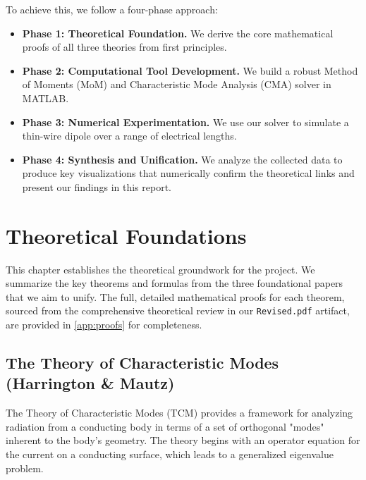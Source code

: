 \documentclass[11pt, a4paper]{report}
\begin{document}
To achieve this, we follow a four-phase approach:
\begin{itemize}
    \item \textbf{Phase 1: Theoretical Foundation.} We derive the core mathematical proofs of all three theories from first principles.
    \item \textbf{Phase 2: Computational Tool Development.} We build a robust Method of Moments (MoM) and Characteristic Mode Analysis (CMA) solver in MATLAB.
    \item \textbf{Phase 3: Numerical Experimentation.} We use our solver to simulate a thin-wire dipole over a range of electrical lengths.
    \item \textbf{Phase 4: Synthesis and Unification.} We analyze the collected data to produce key visualizations that numerically confirm the theoretical links and present our findings in this report.
\end{itemize}

\newpage

\chapter{Theoretical Foundations} \label{ch:theory}

This chapter establishes the theoretical groundwork for the project. We summarize the key theorems and formulas from the three foundational papers that we aim to unify. The full, detailed mathematical proofs for each theorem, sourced from the comprehensive theoretical review in our \texttt{Revised.pdf} artifact, are provided in \cref{app:proofs} for completeness.

\section{The Theory of Characteristic Modes (Harrington \& Mautz)}
The Theory of Characteristic Modes (TCM) provides a framework for analyzing radiation from a conducting body in terms of a set of orthogonal "modes" inherent to the body's geometry. The theory begins with an operator equation for the current on a conducting surface, which leads to a generalized eigenvalue problem.
\end{document}
